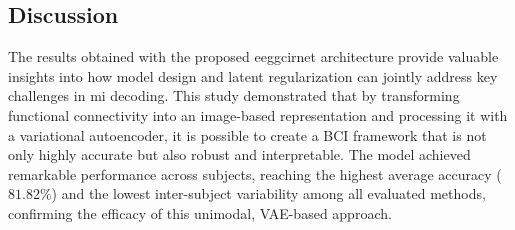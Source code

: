 \subsection{Discussion}\label{sec:Discussion1}

The results obtained with the proposed \gls{eeggcirnet} architecture provide valuable insights into how model design and latent regularization can jointly address key challenges in \gls{mi} decoding. This study demonstrated that by transforming functional connectivity into an image-based representation and processing it with a variational autoencoder, it is possible to create a BCI framework that is not only highly accurate but also robust and interpretable. The model achieved remarkable performance across subjects, reaching the highest average accuracy ($81.82\%$) and the lowest inter-subject variability among all evaluated methods, confirming the efficacy of this unimodal, VAE-based approach.

